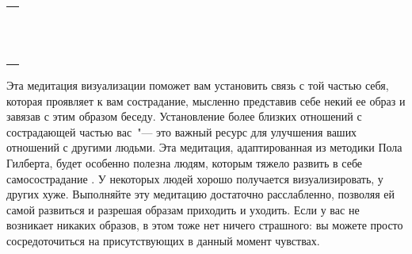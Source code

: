 \setlength{\extrarowheight}{2mm}
\begin{tabularx}{0.96\textwidth}{X}
	\\
	\arrayrulecolor{gray}\hline\\
	\hline\\
	\hline\\
	\hline\\
	\hline\\
	\hline\\	
	\hline\\
	\hline\\
	\hline\\
	\hline\\
	\hline\\
	\hline\\
	\hline\\
\end{tabularx}
\setlength{\extrarowheight}{0mm}


 \label{M:Compassionate_Friend}

Эта медитация визуализации поможет вам установить связь с той частью себя, которая проявляет к вам сострадание, мысленно представив себе некий ее образ и завязав с этим образом беседу. Установление более близких отношений с сострадающей частью вас~"--- это важный ресурс для улучшения ваших отношений с другими людьми. Эта медитация, адаптированная из методики Пола Гилберта, будет особенно полезна людям, которым тяжело развить в себе самосострадание \cite{98}. У некоторых людей хорошо получается визуализировать, у других хуже. Выполняйте эту медитацию достаточно расслабленно, позволяя ей самой развиться и разрешая образам приходить и уходить. Если у вас не возникает никаких образов, в этом тоже нет ничего страшного: вы можете просто сосредоточиться на присутствующих в данный момент чувствах.


